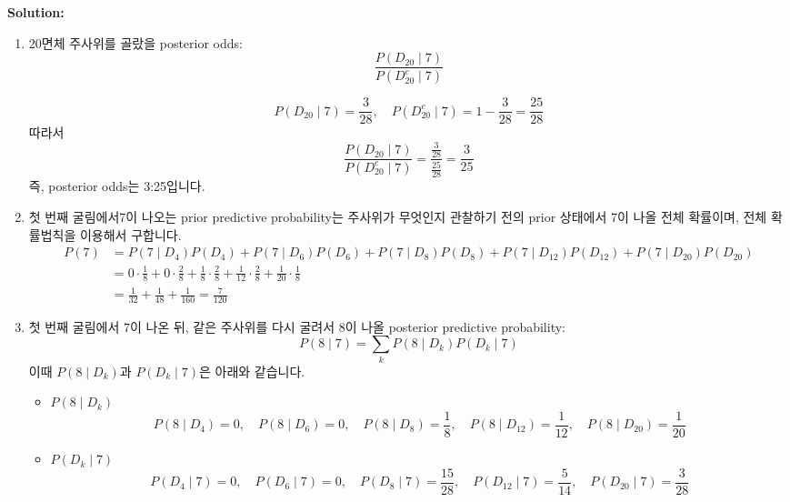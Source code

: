 \documentclass{article}
\newenvironment{solution}
{
    \par\medskip
    \noindent\textbf{Solution:}
    \begin{adjustwidth}{1em}{0em}
}
{
    \end{adjustwidth}
    \medskip
}
\begin{document}
\begin{enumerate}[label=\textbf{\arabic*.}, leftmargin=*]
\begin{solution}
\begin{enumerate}[label=(\alph*), leftmargin=2em, itemsep=1em]
\newpage

            \item $20$면체 주사위를 골랐을 posterior odds:
            $$  
            \frac{P(D_{20}\mid 7)}{P(D_{20}^c\mid 7)}  
            $$  
            
            $$  
            P(D_{20}\mid 7)=\frac3{28},\quad P(D_{20}^c\mid 7)=1-\frac3{28}=\frac{25}{28}  
            $$  
            따라서 
            $$  
            \frac{P(D_{20}\mid 7)}{P(D_{20}^c\mid 7)}=\frac{\frac3{28}}{\frac{25}{28}}=\frac3{25}  
            $$  
            즉, posterior odds는 3:25입니다.  

            \item 첫 번째 굴림에서7이 나오는 prior predictive probability는 주사위가 무엇인지 관찰하기 전의 prior 상태에서 7이 나올 전체 확률이며, 전체 확률법칙을 이용해서 구합니다.
            \begin{align*}
                P(7)&
                =P(7\mid D_4)P(D_4)+P(7\mid D_6)P(D_6)+P(7\mid D_8)P(D_8)+P(7\mid D_{12})P(D_{12})+P(7\mid D_{20})P(D_{20})  \\
                &=0\cdot\frac18+0\cdot\frac28+\frac18\cdot\frac28+\frac1{12}\cdot\frac28+\frac1{20}\cdot\frac18\\  
                &=\frac1{32}+\frac1{48}+\frac1{160}=\frac7{120} 
            \end{align*}  
 

            \item 첫 번째 굴림에서 $7$이 나온 뒤, 같은 주사위를 다시 굴려서 $8$이 나올 posterior predictive probability:  
            $$  
            P(8\mid 7)=\sum_k P(8\mid D_k)P(D_k\mid 7)  
            $$  
            이때 $P(8\mid D_k)$과 $P(D_k\mid 7)$은 아래와 같습니다.\\ 
            \begin{itemize}[itemsep=0em]
                \item $P(8\mid D_k)$
                    $$  
                    P(8\mid D_4)=0,\quad P(8\mid D_6)=0,\quad P(8\mid D_8)=\frac18,\quad P(8\mid D_{12})=\frac1{12},\quad P(8\mid D_{20})=\frac1{20}  
                    $$ 
                 \item $P(D_k\mid 7)$
                    $$
                    P(D_4\mid 7)=0,\quad
                    P(D_6\mid 7)=0,\quad
                    P(D_8\mid 7)=\frac{15}{28},\quad
                    P(D_{12}\mid 7)=\frac5{14},\quad
                    P(D_{20}\mid 7)=\frac3{28}
                    $$
            \end{itemize}


\end{enumerate}
\end{solution}
\end{enumerate}
\end{document}
